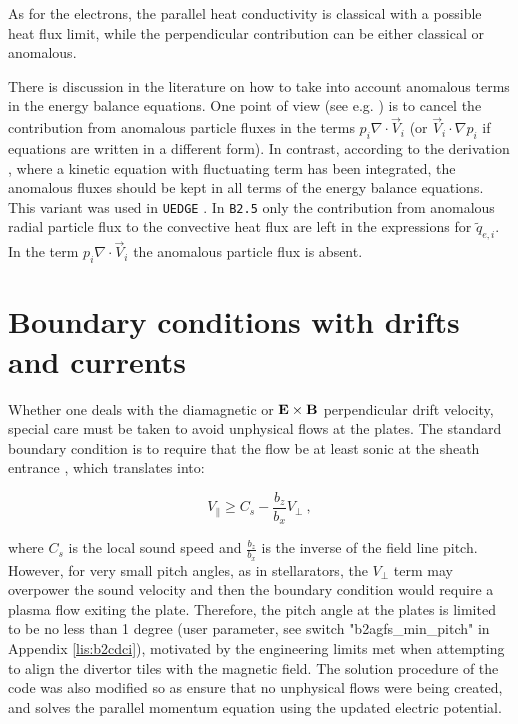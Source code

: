 \documentclass[a4paper,10pt]{report}
\begin{document}
As for the electrons, the parallel heat conductivity is classical with
a possible heat flux limit, while the perpendicular contribution
can be either
classical or anomalous.

There is discussion in the literature on how to take into account anomalous
terms in the energy balance equations. One point of view (see e.g.
\cite{ZAGORSKI98A})
is to cancel the contribution from anomalous particle fluxes in the
terms $p_i \nabla \cdot \vec{V}_i$ (or $\vec{V}_i \cdot \nabla p_i$ if equations
are written in a different form). In contrast, according to the
derivation
\cite{HINTON94C},
where a kinetic equation with fluctuating term has been integrated, the
anomalous fluxes should be kept in all terms of the energy balance
equations. This variant was used in {\tt UEDGE} \cite{ROGNLIEN98A, ROGNLIEN98B, ROGNLIEN99A}.
In {\tt B2.5} only the contribution
from anomalous radial particle flux to the convective heat flux are left
in the expressions for $\tilde{q}_{e,i}$. In the term
$p_i \nabla \cdot \vec{V}_i$ the anomalous particle flux is absent.

\section{Boundary conditions with drifts and currents}

Whether one deals with the diamagnetic or $\bf{E}\times\bf{B}$ perpendicular
drift velocity, special care must be taken to avoid unphysical flows
at the plates. The standard boundary condition is to require that the flow be
at least sonic at the sheath entrance \cite{STANGEBY95B},
which translates into:

\begin{equation}\label{eq:Chodura}
V_{\parallel} \ge C_s - \frac{b_z}{b_x} V_{\perp} ~,
\end{equation}

where $C_s$ is the local sound speed and $\frac{b_z}{b_x}$ is the inverse
of the field line pitch. However, for very small pitch angles, as in
stellarators, the $V_{\perp}$ term may overpower the sound
velocity \cite{FENG99A}
and then the boundary condition would require a plasma flow exiting the plate.
Therefore, the pitch angle at the plates is limited to be no less than
1 degree (user parameter, see switch "b2agfs\_min\_pitch" in Appendix \ref{lis:b2cdci}),
motivated by the engineering limits met when attempting to align the
divertor tiles with the magnetic field. The solution procedure of the code
was also modified so as ensure that no unphysical flows were being created,
and solves the parallel momentum equation using the updated electric potential.
\end{document}
